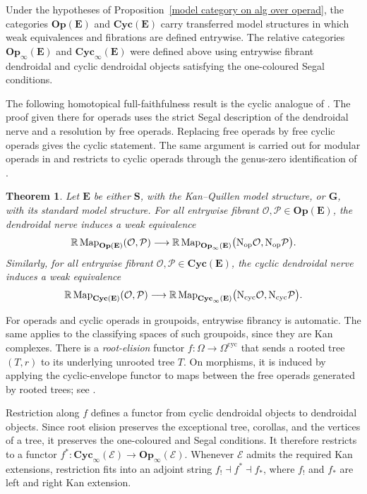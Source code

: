 \documentclass{amsart}
\newcommand{\bE}{\mathbf{E}}
\newcommand{\sSet}{\mathbf{S}}
\newcommand{\Grpd}{\mathbf{G}}
\newcommand{\Cyc}{\mathbf{Cyc}}
\newcommand{\Op}{\mathbf{Op}}
\newcommand{\Map}{\operatorname{Map}}
\newcommand{\nerve}{\textnormal{N}}
\newtheorem{theorem}{Theorem}[section]
\theoremstyle{definition}
\numberwithin{equation}{section}
\begin{document}
Under the hypotheses of
Proposition~\ref{model category on alg over operad}, the categories
$\Op(\bE)$ and $\Cyc(\bE)$ carry transferred model structures in
which weak equivalences and fibrations are defined entrywise. The
relative categories $\Op_\infty(\bE)$ and $\Cyc_\infty(\bE)$ were
defined above using entrywise fibrant dendroidal and cyclic
dendroidal objects satisfying the one-coloured Segal conditions.

The following homotopical full-faithfulness result is the cyclic
analogue of
\cite[Proposition~4.3]{Boavida-Horel-Robertson}. The proof given
there for operads uses the strict Segal description of the
dendroidal nerve and a resolution by free operads. Replacing free
operads by free cyclic operads gives the cyclic statement. The same
argument is carried out for modular operads in
\cite[Theorem~B.2]{BR_modular} and restricts to cyclic operads
through the genus-zero identification of
\cite[Proposition~A.11]{BR_modular}.

\begin{theorem}
\label{thm: dendroidal nerve is homotopically fully faithful}
Let $\bE$ be either $\sSet$, with the Kan--Quillen model structure,
or $\Grpd$, with its standard model structure. For all entrywise
fibrant $\mathcal O,\mathcal P\in\Op(\bE)$, the dendroidal nerve
induces a weak equivalence
\[
\mathbb R\Map_{\Op(\bE)}(\mathcal O,\mathcal P)
\longrightarrow
\mathbb R\Map_{\Op_\infty(\bE)}
\bigl(
\nerve_{\mathrm{op}}\mathcal O,
\nerve_{\mathrm{op}}\mathcal P
\bigr).
\]
Similarly, for all entrywise fibrant
$\mathcal O,\mathcal P\in\Cyc(\bE)$, the cyclic dendroidal nerve
induces a weak equivalence
\[
\mathbb R\Map_{\Cyc(\bE)}(\mathcal O,\mathcal P)
\longrightarrow
\mathbb R\Map_{\Cyc_\infty(\bE)}
\bigl(
\nerve_{\mathrm{cyc}}\mathcal O,
\nerve_{\mathrm{cyc}}\mathcal P
\bigr).
\]
\end{theorem}

For operads and cyclic operads in groupoids, entrywise fibrancy is
automatic. The same applies to the classifying spaces of such
groupoids, since they are Kan complexes.
There is a \emph{root-elision} functor
$f\colon\Omega\to\Omega^{\mathrm{cyc}}$ that sends a rooted tree
$(T,r)$ to its underlying unrooted tree $T$. On morphisms, it is
induced by applying the cyclic-envelope functor to maps between the
free operads generated by rooted trees; see
\cite[Definition~4.11]{doherty2025models}.

Restriction along $f$ defines a functor from cyclic dendroidal
objects to dendroidal objects. Since root elision preserves the
exceptional tree, corollas, and the vertices of a tree, it preserves
the one-coloured and Segal conditions. It therefore restricts to a
functor
$f^*\colon\Cyc_\infty(\mathcal E)\to\Op_\infty(\mathcal E)$.
Whenever $\mathcal E$ admits the required Kan extensions, restriction
fits into an adjoint string
$f_!\dashv f^*\dashv f_*$, where $f_!$ and $f_*$ are left and right
Kan extension.
\end{document}
